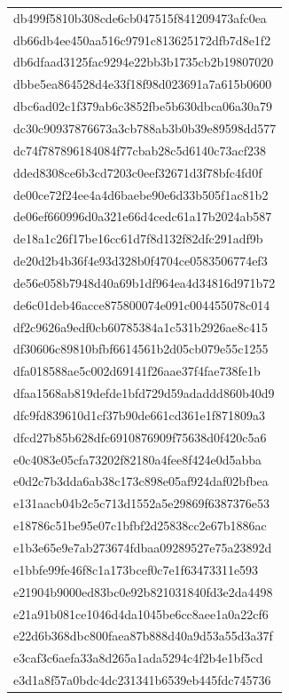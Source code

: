 \begin{tabular}{l}
db499f5810b308cde6cb047515f841209473afc0ea \\
db66db4ee450aa516c9791c813625172dfb7d8e1f2 \\
db6dfaad3125fac9294e22bb3b1735cb2b19807020 \\
dbbe5ea864528d4e33f18f98d023691a7a615b0600 \\
dbc6ad02c1f379ab6c3852fbe5b630dbca06a30a79 \\
dc30c90937876673a3cb788ab3b0b39e89598dd577 \\
dc74f787896184084f77cbab28c5d6140c73acf238 \\
dded8308ce6b3cd7203c0eef32671d3f78bfc4fd0f \\
de00ce72f24ee4a4d6baebe90e6d33b505f1ac81b2 \\
de06ef660996d0a321e66d4cedc61a17b2024ab587 \\
de18a1c26f17be16cc61d7f8d132f82dfc291adf9b \\
de20d2b4b36f4e93d328b0f4704ce0583506774ef3 \\
de56e058b7948d40a69b1df964ea4d34816d971b72 \\
de6c01deb46acce875800074e091c004455078c014 \\
df2c9626a9edf0cb60785384a1c531b2926ae8c415 \\
df30606c89810bfbf6614561b2d05cb079e55c1255 \\
dfa018588ae5c002d69141f26aae37f4fae738fe1b \\
dfaa1568ab819defde1bfd729d59adaddd860b40d9 \\
dfc9fd839610d1cf37b90de661cd361e1f871809a3 \\
dfcd27b85b628dfc6910876909f75638d0f420c5a6 \\
e0c4083e05cfa73202f82180a4fee8f424e0d5abba \\
e0d2c7b3dda6ab38c173c898e05af924daf02bfbea \\
e131aacb04b2c5c713d1552a5e29869f6387376e53 \\
e18786c51be95e07c1bfbf2d25838cc2e67b1886ac \\
e1b3e65e9e7ab273674fdbaa09289527e75a23892d \\
e1bbfe99fe46f8c1a173bcef0c7e1f63473311e593 \\
e21904b9000ed83bc0e92b821031840fd3e2da4498 \\
e21a91b081ce1046d4da1045be6cc8aee1a0a22cf6 \\
e22d6b368dbc800faea87b888d40a9d53a55d3a37f \\
e3caf3c6aefa33a8d265a1ada5294c4f2b4e1bf5cd \\
e3d1a8f57a0bdc4dc231341b6539eb445fdc745736 \\

\end{tabular}
